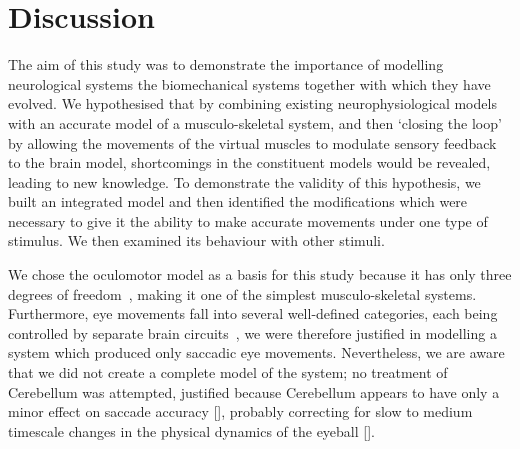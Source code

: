 \documentclass{frontiersSCNS}
\begin{document}




\section{Discussion}

The aim of this study was to demonstrate the importance of modelling
neurological systems  the biomechanical systems
together with which they have evolved. We hypothesised that by combining
existing neurophysiological models with an accurate
model of a musculo-skeletal system, and then `closing the loop' by allowing
the movements of the virtual muscles to modulate sensory feedback to
the brain model, shortcomings in the constituent models would be
revealed, leading to new knowledge. To demonstrate the validity
of this hypothesis, we built an integrated model and then identified the
modifications which were necessary to give it the ability to make
accurate movements under one type of stimulus. We then
examined its behaviour with other stimuli.

We chose the oculomotor model as a basis for this study because it has
only three degrees of freedom~\cite{ref}, making it one of the simplest
musculo-skeletal systems. Furthermore, eye movements fall into several
well-defined categories, each being controlled by separate
brain circuits~\cite{refs}, we were therefore justified in modelling a
system which produced only saccadic eye movements. Nevertheless, we are
aware that we did not create a complete model of the system; no treatment
of Cerebellum was attempted, justified because Cerebellum appears to have
only a minor effect on saccade accuracy [\cite{refs}], probably correcting
for slow to medium timescale changes in the physical dynamics of the
eyeball [\cite{refs}].
\end{document}
